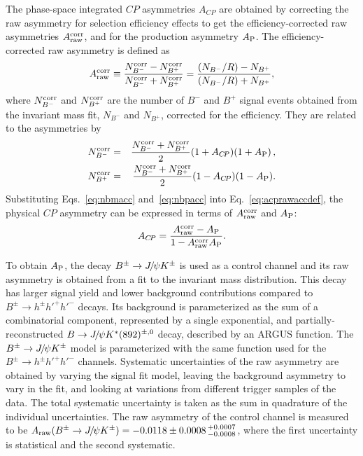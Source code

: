 \documentclass[12pt,a4paper]{article}
\def\Ppsi        {\ensuremath{\uppsi}\xspace}
\def\PB      {\ensuremath{\mathrm{B}}\xspace}
\def\PJ      {\ensuremath{\mathrm{J}}\xspace}
\def\PK      {\ensuremath{\mathrm{K}}\xspace}
\def\Ph      {\ensuremath{\mathrm{h}}\xspace}
\def\Ppsi        {\ensuremath{\psi}\xspace}
\def\PB      {\ensuremath{B}\xspace}
\def\PJ      {\ensuremath{J}\xspace}
\def\PK      {\ensuremath{K}\xspace}
\def\Ph      {\ensuremath{h}\xspace}
\def\kaon    {{\ensuremath{\PK}}\xspace}
\def\Kpm     {{\ensuremath{\kaon^\pm}}\xspace}
\def\B       {{\ensuremath{\PB}}\xspace}
\def\Bu      {{\ensuremath{\B^+}}\xspace}
\def\Bub     {{\ensuremath{\B^-}}\xspace}
\def\Bp      {{\ensuremath{\Bu}}\xspace}
\def\Bm      {{\ensuremath{\Bub}}\xspace}
\def\Bpm     {{\ensuremath{\B^\pm}}\xspace}
\def\jpsi     {{\ensuremath{{\PJ\mskip -3mu/\mskip -2mu\Ppsi}}}\xspace}
\newcommand{\decay}[2]{\ensuremath{#1\!\to #2}\xspace}
\def\to                 {\ensuremath{\rightarrow}\xspace}
\def\CP                {{\ensuremath{C\!P}}\xspace}
\def\Bhhh        {\decay{\Bpm}{\Ph^{\pm} \Ph'^+\Ph'^-}}
\def\jpsik {\ensuremath{{\Bpm \to \jpsi \Kpm}}\xspace}
\def\acp {\ensuremath{A_{\CP}}\xspace}
\def\acpraw {\ensuremath{A_{\rm raw}}\xspace}
\def\acprawacc {\ensuremath{A_{\rm raw}^{\rm corr}}\xspace}
\def\aprod {\ensuremath{A_{\rm P}}\xspace}
\begin{document}
The phase-space integrated \CP asymmetries \acp are obtained by correcting the raw asymmetry for selection efficiency effects to get the efficiency-corrected raw asymmetries \acprawacc, and for the production  asymmetry $\aprod$. The efficiency-corrected raw asymmetry is defined as
\begin{equation}
\acprawacc \equiv \dfrac{N_{B^-}^{\rm corr} - N_{B^+}^{\rm corr}}{N_{B^-}^{\rm corr} + N_{B^+}^{\rm corr}} = \dfrac{(N_{B^-}/R) - N_{B^+}}{(N_{B^-}/R) + N_{B^+}}, 
\label{eq:acprawaccdef}
\end{equation}
where $N_{B^-}^{\rm corr}$ and $N_{B^+}^{\rm corr}$ are the number of \Bm and \Bp signal events obtained from the invariant mass fit, $N_{B^-}$ and $N_{B^+}$, corrected for the efficiency. 
They are related to the asymmetries by
\begin{eqnarray}
N_{\Bm}^{\rm corr} &=& \dfrac{N_{\Bm}^{\rm corr}+N_{\Bp}^{\rm corr}}{2} (1+\acp)(1+\aprod)\, , \label{eq:nbmacc} \\
N_{\Bp}^{\rm corr} &=& \dfrac{N_{\Bm}^{\rm corr}+N_{\Bp}^{\rm corr}}{2} (1-\acp)(1-\aprod).
\label{eq:nbpacc}  
\end{eqnarray}
Substituting Eqs.~\eqref{eq:nbmacc} and~\eqref{eq:nbpacc} into Eq.~\eqref{eq:acprawaccdef}, the physical \CP asymmetry can be expressed in terms of \acprawacc and \aprod:
\begin{equation}
\acp = \frac{ \acprawacc - \aprod }{ 1 - \acprawacc \aprod }.
\label{eq:acpNoAdet}
\end{equation} 

To obtain \aprod, the decay \jpsik is used as a control channel and its raw asymmetry is obtained from a fit to the invariant mass distribution. This decay has larger signal yield and lower background contributions compared to \Bhhh decays. 
Its background is parameterized as the sum of a combinatorial component, represented by a single exponential, and partially-reconstructed $B\to \jpsi K^*(892)^{\pm,0}$ decay, described by an ARGUS function. 
The \jpsik model is parameterized with the same function used for the \Bhhh channels. 
Systematic uncertainties of the raw asymmetry are obtained by varying the signal fit model, leaving the background asymmetry to vary in the fit, and looking at variations from different trigger samples of the data. The total systematic uncertainty is taken as the sum in quadrature of the individual uncertainties. 
The raw asymmetry of the control channel is measured to be $\acpraw(\jpsik) =-0.0118 \pm 0.0008 \,^{+0.0007}_{-0.0008}$, where the first uncertainty is statistical and the second systematic.
\end{document}
